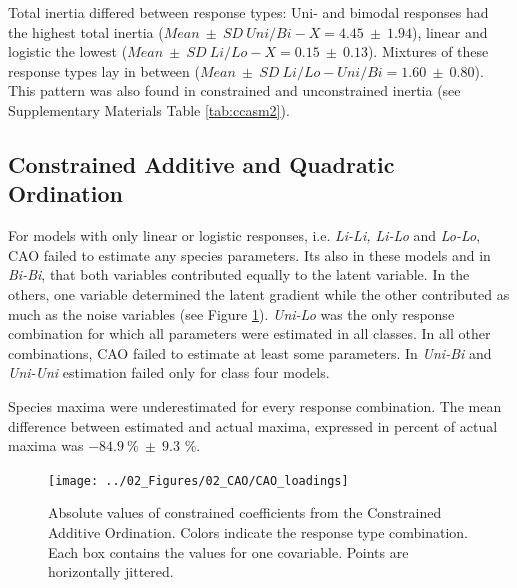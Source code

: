 		
		Total inertia differed between response types: Uni- and bimodal responses had the highest total inertia ($Mean\ \pm\ SD\ \scriptscriptstyle Uni/Bi-X \textstyle = 4.45\ \pm\ 1.94$), linear and logistic the lowest ($Mean\ \pm\ SD\ \scriptscriptstyle Li/Lo-X \textstyle = 0.15\ \pm\ 0.13$). 
		Mixtures of these response types lay in between ($Mean\ \pm\ SD\ \scriptscriptstyle Li/Lo-Uni/Bi\textstyle = 1.60\ \pm\ 0.80$).
		This pattern was also found in constrained and unconstrained inertia (see Supplementary Materials Table \ref{tab:ccasm2}).

	
	\subsection{Constrained Additive and Quadratic Ordination}
	
	
		For	models with only linear or logistic responses, i.e. \textit{Li-Li, Li-Lo} and \textit{Lo-Lo}, CAO failed to estimate any species parameters. 
		Its also in these models and in \textit{Bi-Bi}, that both variables contributed equally to the latent variable. 
		In the others, one variable determined the latent gradient while the other contributed as much as the noise variables (see Figure \ref{fig:caoonlyone}). 
		\textit{Uni-Lo} was the only response combination for which all parameters were estimated in all classes. 
		In all other combinations, CAO failed to estimate at least some parameters.
		In \textit{Uni-Bi} and \textit{Uni-Uni} estimation failed only for class four models.
		
		Species maxima were underestimated for every response combination. 
		The mean difference between estimated and actual maxima, expressed in percent of actual maxima was $-84.9\ \%\ \pm\ 9.3$ \%.\\ 
	
	\begin{figure}[h!]
		\centering
		\texttt{[image: ../02\_Figures/02\_CAO/CAO\_loadings]}
		\caption{
			Absolute values of constrained coefficients from the Constrained Additive Ordination. 
			Colors indicate the response type combination. 
			Each box contains the values for one covariable. 
			Points are horizontally jittered.
		}
		\label{fig:caoonlyone}
	\end{figure}


